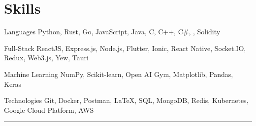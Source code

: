 \documentclass[]{resume-openfont}
\begin{document}
    \section{Skills}
        \begin{skillsListIndent}
            \item[Languages] {\fontsize{9pt}{10pt}  Python, Rust, Go, JavaScript, Java, C, C++, C\#, , Solidity}\\
            \item[Full-Stack]{\fontsize{9pt}{10pt}  ReactJS, Express.js, Node.js, Flutter, Ionic, React Native, Socket.IO, Redux, Web3.js, Yew, Tauri}\\
            \item[Machine Learning]{\fontsize{9pt}{10pt}  NumPy, Scikit-learn, Open AI Gym, Matplotlib, Pandas, Keras}\\
            \item[Technologies]{\fontsize{9pt}{10pt}  Git, Docker, Postman, \LaTeX, SQL, MongoDB, Redis, Kubernetes, Google Cloud Platform, AWS}\\
        \end{skillsListIndent}
        \sectionsep
    \hrule
\end{document}
